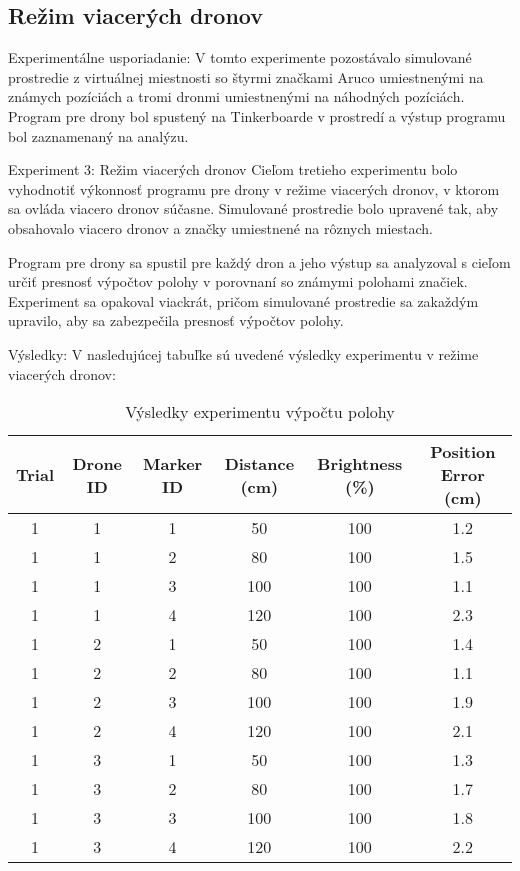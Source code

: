 \subsection{Režim viacerých dronov}
Experimentálne usporiadanie:
V tomto experimente pozostávalo simulované prostredie z virtuálnej miestnosti so štyrmi značkami Aruco umiestnenými na známych pozíciách a tromi dronmi umiestnenými na náhodných pozíciách. Program pre drony bol spustený na Tinkerboarde v prostredí a výstup programu bol zaznamenaný na analýzu.

Experiment 3: Režim viacerých dronov
Cieľom tretieho experimentu bolo vyhodnotiť výkonnosť programu pre drony v režime viacerých dronov, v ktorom sa ovláda viacero dronov súčasne. Simulované prostredie bolo upravené tak, aby obsahovalo viacero dronov a značky umiestnené na rôznych miestach.

Program pre drony sa spustil pre každý dron a jeho výstup sa analyzoval s cieľom určiť presnosť výpočtov polohy v porovnaní so známymi polohami značiek. Experiment sa opakoval viackrát, pričom simulované prostredie sa zakaždým upravilo, aby sa zabezpečila presnosť výpočtov polohy.

Výsledky:
V nasledujúcej tabuľke sú uvedené výsledky experimentu v režime viacerých dronov:
 
\begin{table}[h!] 
    \centering
        \begin{tabular}{|c| c| c| c| c| c |} 
        \hline
        Trial & Drone ID & Marker ID & Distance (cm) & Brightness (\%)& Position Error (cm) \\
        \hline\hline
        1 & 1 & 1 & 50 & 100 & 1.2 \\ 
        1 & 1 & 2 & 80 & 100 & 1.5 \\ 
        1 & 1 & 3 & 100 & 100 & 1.1 \\ 
        1 & 1 & 4 & 120 & 100 & 2.3 \\ 
        1 & 2 & 1 & 50 & 100 & 1.4 \\ 
        1 & 2 & 2 & 80 & 100 & 1.1 \\ 
        1 & 2 & 3 & 100 & 100 & 1.9 \\ 
        1 & 2 & 4 & 120 & 100 & 2.1 \\ 
        1 & 3 & 1 & 50 & 100 & 1.3 \\ 
        1 & 3 & 2 & 80 & 100 & 1.7 \\ 
        1 & 3 & 3 & 100 & 100 & 1.8 \\ 
        1 & 3 & 4 & 120 & 100 & 2.2 \\ 
        \hline
       \end{tabular}
       \caption{Výsledky experimentu výpočtu polohy}
        \label{table:1}
\end{table}

